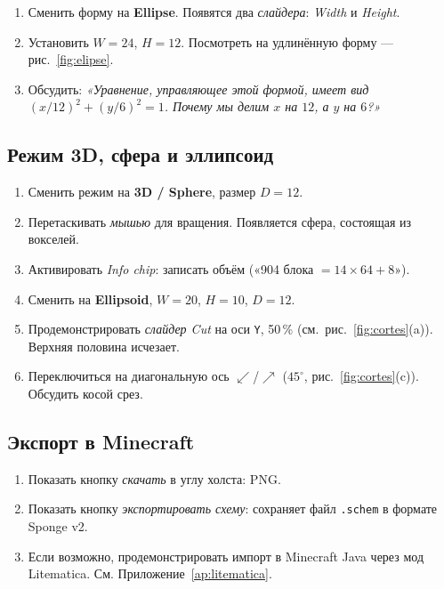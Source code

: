 \documentclass[12pt,a4paper]{scrartcl}
\newcommand{\acc}[1]{\textcolor{accent}{\textbf{#1}}}
\begin{document}
\begin{enumerate}[leftmargin=1.5em,itemsep=0.15em,topsep=0.3em]
  \item Сменить форму на \acc{Ellipse}. Появятся два \emph{слайдера}: \emph{Width} и \emph{Height}.
  \item Установить $W = 24$, $H = 12$. Посмотреть на удлинённую форму --- рис.~\ref{fig:elipse}.
  \item Обсудить: \emph{«Уравнение, управляющее этой формой, имеет вид $(x/12)^2 + (y/6)^2 = 1$. Почему мы делим $x$ на $12$, а $y$ на $6$?»}
\end{enumerate}

\subsection{Режим 3D, сфера и эллипсоид}

\begin{enumerate}[leftmargin=1.5em,itemsep=0.15em,topsep=0.3em]
  \item Сменить режим на \acc{3D / Sphere}, размер $D = 12$.
  \item Перетаскивать \emph{мышью} для вращения. Появляется сфера, состоящая из вокселей.
  \item Активировать \emph{Info chip}: записать объём («904 блока $=14 \times 64 + 8$»).
  \item Сменить на \acc{Ellipsoid}, $W = 20$, $H = 10$, $D = 12$.
  \item Продемонстрировать \emph{слайдер Cut} на оси \texttt{Y}, 50\,\% (см.\ рис.~\ref{fig:cortes}(a)). Верхняя половина исчезает.
  \item Переключиться на диагональную ось $\swarrow$/$\nearrow$ ($45^\circ$, рис.~\ref{fig:cortes}(c)). Обсудить косой срез.
\end{enumerate}

\subsection{Экспорт в Minecraft}
\begin{enumerate}[leftmargin=1.5em,itemsep=0.15em,topsep=0.3em]
  \item Показать кнопку \emph{скачать} в углу холста: PNG.
  \item Показать кнопку \emph{экспортировать схему}: сохраняет файл \texttt{.schem} в формате Sponge v2.
  \item Если возможно, продемонстрировать импорт в Minecraft Java через мод Litematica. См. Приложение~\ref{ap:litematica}.
\end{enumerate}
\end{document}
